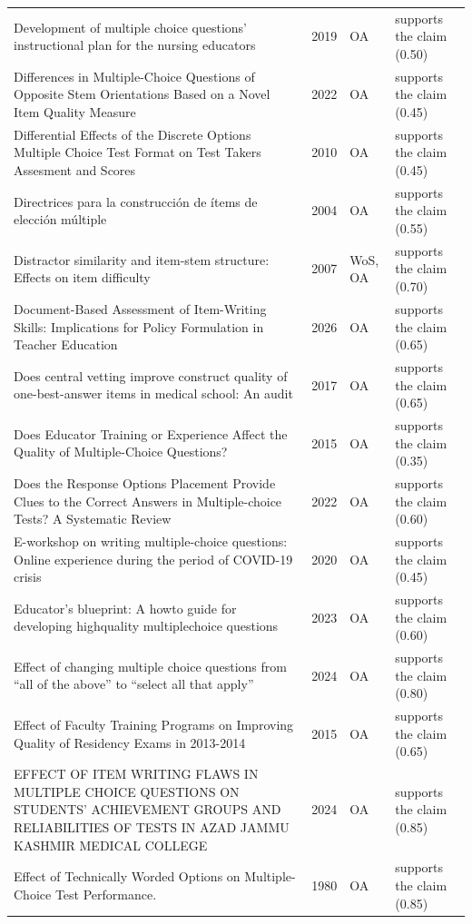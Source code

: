 \begin{longtable}{@{}%
  >{\raggedright\arraybackslash}p{}c%
  >{\raggedright\arraybackslash}p{}%
  >{\raggedright\arraybackslash}p{}@{}}
Development of multiple choice questions' instructional plan for the nursing educators & 2019 & OA & supports the claim (0.50) \\
Differences in Multiple-Choice Questions of Opposite Stem Orientations Based on a Novel Item Quality Measure & 2022 & OA & supports the claim (0.45) \\
Differential Effects of the Discrete Options Multiple Choice Test Format on Test Takers Assesment and Scores & 2010 & OA & supports the claim (0.45) \\
Directrices para la construcción de ítems de elección múltiple & 2004 & OA & supports the claim (0.55) \\
Distractor similarity and item-stem structure: Effects on item difficulty & 2007 & WoS, OA & supports the claim (0.70) \\
Document-Based Assessment of Item-Writing Skills: Implications for Policy Formulation in Teacher Education & 2026 & OA & supports the claim (0.65) \\
Does central vetting improve construct quality of one-best-answer items in medical school: An audit & 2017 & OA & supports the claim (0.65) \\
Does Educator Training or Experience Affect the Quality of Multiple-Choice Questions? & 2015 & OA & supports the claim (0.35) \\
Does the Response Options Placement Provide Clues to the Correct Answers in Multiple-choice Tests? A Systematic Review & 2022 & OA & supports the claim (0.60) \\
E-workshop on writing multiple-choice questions: Online experience during the period of COVID-19 crisis & 2020 & OA & supports the claim (0.45) \\
Educator's blueprint: A howto guide for developing highquality multiplechoice questions & 2023 & OA & supports the claim (0.60) \\
Effect of changing multiple choice questions from ``all of the above'' to ``select all that apply'' & 2024 & OA & supports the claim (0.80) \\
Effect of Faculty Training Programs on Improving Quality of Residency Exams in 2013-2014 & 2015 & OA & supports the claim (0.65) \\
EFFECT OF ITEM WRITING FLAWS IN MULTIPLE CHOICE QUESTIONS ON STUDENTS' ACHIEVEMENT GROUPS AND RELIABILITIES OF TESTS IN AZAD JAMMU KASHMIR MEDICAL COLLEGE & 2024 & OA & supports the claim (0.85) \\
Effect of Technically Worded Options on Multiple-Choice Test Performance. & 1980 & OA & supports the claim (0.85) \\

\end{longtable}
